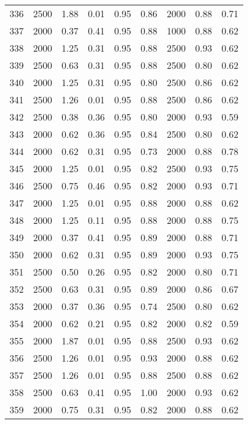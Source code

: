 \begin{longtable}[c]{ccccccccc}
336 &  2500 &  1.88 &  0.01 &  0.95 &  0.86 &  2000 &  0.88 &  0.71 \\
337 &  2000 &  0.37 &  0.41 &  0.95 &  0.88 &  1000 &  0.88 &  0.62 \\
338 &  2000 &  1.25 &  0.31 &  0.95 &  0.88 &  2500 &  0.93 &  0.62 \\
339 &  2500 &  0.63 &  0.31 &  0.95 &  0.88 &  2500 &  0.80 &  0.62 \\
340 &  2000 &  1.25 &  0.31 &  0.95 &  0.80 &  2500 &  0.86 &  0.62 \\
341 &  2500 &  1.26 &  0.01 &  0.95 &  0.88 &  2500 &  0.86 &  0.62 \\
342 &  2500 &  0.38 &  0.36 &  0.95 &  0.80 &  2000 &  0.93 &  0.59 \\
343 &  2000 &  0.62 &  0.36 &  0.95 &  0.84 &  2500 &  0.80 &  0.62 \\
344 &  2000 &  0.62 &  0.31 &  0.95 &  0.73 &  2000 &  0.88 &  0.78 \\
345 &  2000 &  1.25 &  0.01 &  0.95 &  0.82 &  2500 &  0.93 &  0.75 \\
346 &  2500 &  0.75 &  0.46 &  0.95 &  0.82 &  2000 &  0.93 &  0.71 \\
347 &  2000 &  1.25 &  0.01 &  0.95 &  0.88 &  2000 &  0.88 &  0.62 \\
348 &  2000 &  1.25 &  0.11 &  0.95 &  0.88 &  2000 &  0.88 &  0.75 \\
349 &  2000 &  0.37 &  0.41 &  0.95 &  0.89 &  2000 &  0.88 &  0.71 \\
350 &  2000 &  0.62 &  0.31 &  0.95 &  0.89 &  2000 &  0.93 &  0.75 \\
351 &  2500 &  0.50 &  0.26 &  0.95 &  0.82 &  2000 &  0.80 &  0.71 \\
352 &  2500 &  0.63 &  0.31 &  0.95 &  0.89 &  2000 &  0.86 &  0.67 \\
353 &  2000 &  0.37 &  0.36 &  0.95 &  0.74 &  2500 &  0.80 &  0.62 \\
354 &  2000 &  0.62 &  0.21 &  0.95 &  0.82 &  2000 &  0.82 &  0.59 \\
355 &  2000 &  1.87 &  0.01 &  0.95 &  0.88 &  2500 &  0.93 &  0.62 \\
356 &  2500 &  1.26 &  0.01 &  0.95 &  0.93 &  2000 &  0.88 &  0.62 \\
357 &  2500 &  1.26 &  0.01 &  0.95 &  0.88 &  2500 &  0.88 &  0.62 \\
358 &  2500 &  0.63 &  0.41 &  0.95 &  1.00 &  2000 &  0.93 &  0.62 \\
359 &  2000 &  0.75 &  0.31 &  0.95 &  0.82 &  2000 &  0.88 &  0.62 \\

\end{longtable}
